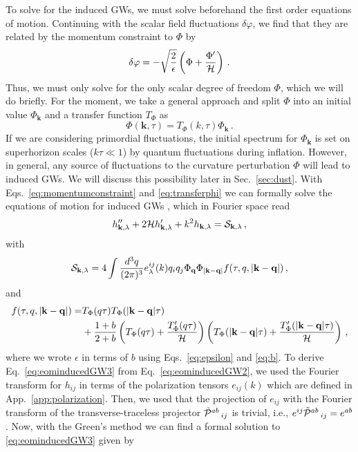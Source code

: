 \documentclass[a4paper,11pt]{article}
\numberwithin{equation}{section}
\begin{document}
To solve for the induced GWs, we must solve beforehand the first order equations of motion. Continuing with the scalar field fluctuations $\delta\varphi$, we find that they are related by the momentum constraint to $\Phi$ by \cite{Koyama:2010xj}
\begin{equation}\label{eq:momentumconstraint}
\delta\varphi=-\sqrt{\frac{2}{\epsilon}}\left(\Phi+\frac{\Phi'}{\cal H}\right)\,.
\end{equation}
Thus, we must only solve for the only scalar degree of freedom $\Phi$, which we will do briefly. For the moment, we take a general approach and split $\Phi$ into an initial value $\Phi_{\mathbf{k}}$ and a transfer function $T_\Phi$ as
\begin{equation}\label{eq:transferphi}
\Phi({\mathbf{k}},\tau)=T_\Phi(k,\tau)\Phi_{\mathbf{k}}\,.
\end{equation}
If we are considering primordial fluctuations, the initial spectrum for $\Phi_{\mathbf{k}}$ is set on superhorizon scales ($k\tau\ll1$) by quantum fluctuations during inflation. However, in general, any source of fluctuations to the curvature perturbation $\Phi$ will lead to induced GWs. We will discuss this possibility later in Sec.~\ref{sec:dust}.  With Eqs.~\eqref{eq:momentumconstraint} and \eqref{eq:transferphi} we can formally solve the equations of motion for induced GWs \cite{Ananda:2006af,Baumann:2007zm}, which in Fourier space read
\begin{equation}\label{eq:eominducedGW3}
h''_{\mathbf{k},\lambda}+2{\cal H} h'_{\mathbf{k},\lambda}+k^2 h_{\mathbf{k},\lambda}={\cal S}_{\mathbf{k},\lambda}\,,
\end{equation}
with
\begin{equation}
{\cal S}_{\mathbf{k},\lambda}=4\int \frac{d^3q}{(2\pi)^3} e_\lambda^{ij}(k)q_iq_j \Phi_{\mathbf{q}}\Phi_{|\mathbf{k-q}|} f(\tau, q,|\mathbf{k-q}|)\,,
\end{equation}
and
\begin{align}\label{eq:f}
f(\tau, q,|\mathbf{k-q}|)=&T_\Phi(q\tau)T_\Phi(|\mathbf{k}-\mathbf{q}|\tau)\nonumber\\&+\frac{1+b}{2+b}\left(T_\Phi(q\tau)+\frac{T'_\Phi(q\tau)}{\cal H}\right)\left(T_\Phi(|\mathbf{k}-\mathbf{q}|\tau)+\frac{T'_\Phi(|\mathbf{k}-\mathbf{q}|\tau)}{\cal H}\right)\,,
\end{align}
where we wrote $\epsilon$ in terms of $b$ using Eqs.~\eqref{eq:epsilon} and \eqref{eq:b}.
To derive Eq.~\eqref{eq:eominducedGW3} from Eq.~\eqref{eq:eominducedGW2}, we used the Fourier transform for $h_{ij}$ in terms of the polarization tensors $e_{ij}(k)$ which are defined in App.~\ref{app:polarization}. Then, we used that the projection of $e_{ij}$ with the Fourier transform of the transverse-traceless projector $\tilde {\cal P}^{ab}\,_{ij}$ is trivial, i.e., $e^{ij}\tilde {\cal P}^{ab}\,_{ij}=e^{ab}$. Now, with the Green's method we can find a formal solution to \eqref{eq:eominducedGW3} given by
\end{document}
